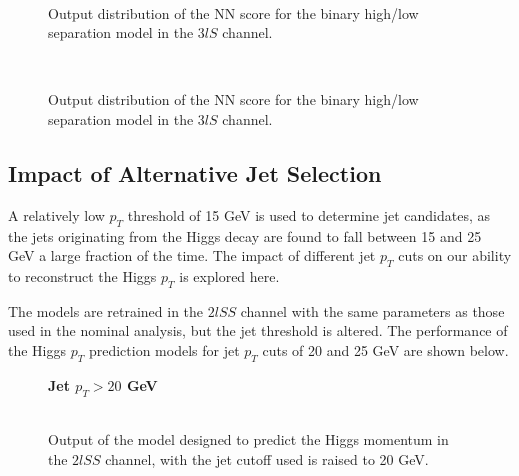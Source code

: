 \begin{figure}[H]
  \\                                
  \caption{Output distribution of the NN score for the binary high/low \pt separation model in the $3lS$ channel.}
  \label{fig:bin3lSroc}
\end{figure} 

\begin{figure}[H]
  \\                                
  \caption{Output distribution of the NN score for the binary high/low \pt separation model in the $3lS$ channel.}
  \label{fig:bin3lFroc}
\end{figure} 

\subsection{Impact of Alternative Jet Selection}
\label{subsec:ptCutApx}

A relatively low $p_T$ threshold of 15 GeV is used to determine jet candidates, as the jets originating from the Higgs decay are found to fall between 15 and 25 GeV a large fraction of the time. The impact of different jet $p_T$ cuts on our ability to reconstruct the Higgs $p_T$ is explored here. 

The models are retrained in the $2lSS$ channel with the same parameters as those used in the nominal analysis, but the jet \pt threshold is altered. The performance of the Higgs $p_T$ prediction models for jet $p_T$ cuts of 20 and 25 GeV are shown below.

\begin{figure}[H]
    \centering
    \textbf{Jet $p_T > 20$ GeV}
    \\           
    \\                       
    \caption{Output of the model designed to predict the Higgs momentum in the $2lSS$ channel, with the jet \pt cutoff used is raised to 20 GeV.}
    \label{fig:pt2lSS_20}
\end{figure} 

